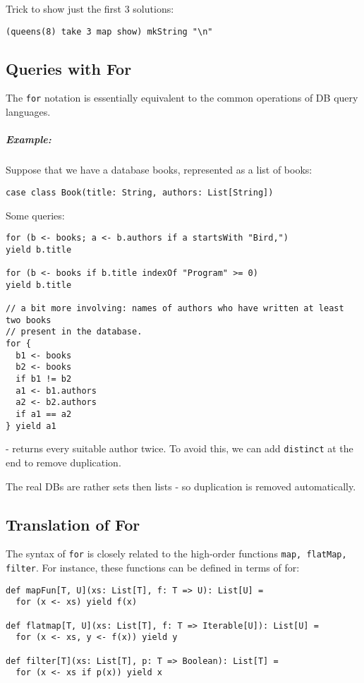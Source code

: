 \documentclass{scrartcl}
\newcommand{\example}{\subparagraph{Example:}} %
\newcommand{\term}[1]{\verb~#1~} %
\begin{document}
Trick to show just the first 3 solutions:
\begin{lstlisting}
(queens(8) take 3 map show) mkString "\n"
\end{lstlisting}

\subsection{Queries with For}
\label{sec:QueriesWithFor}

The \term{for} notation is essentially equivalent to the common operations of
DB query languages.
\example Suppose that we have a database books, represented as a list of books:
\begin{lstlisting}
case class Book(title: String, authors: List[String])
\end{lstlisting}

Some queries:
\begin{lstlisting}
for (b <- books; a <- b.authors if a startsWith "Bird,")
yield b.title

for (b <- books if b.title indexOf "Program" >= 0)
yield b.title

// a bit more involving: names of authors who have written at least two books
// present in the database.
for {
  b1 <- books
  b2 <- books
  if b1 != b2
  a1 <- b1.authors
  a2 <- b2.authors
  if a1 == a2
} yield a1
\end{lstlisting}
- returns every suitable author twice. To avoid this, we can add
\lstinline|distinct| at the end to remove duplication.

The real DBs are rather sets then lists - so duplication is removed
automatically.


\subsection{Translation of For}
\label{sec:TranslationOfFor}

The syntax of \lstinline|for| is closely related to the high-order functions
\lstinline|map, flatMap, filter|. For instance, these functions can be defined
in terms of for:
\begin{lstlisting}
def mapFun[T, U](xs: List[T], f: T => U): List[U] =
  for (x <- xs) yield f(x)

def flatmap[T, U](xs: List[T], f: T => Iterable[U]): List[U] =
  for (x <- xs, y <- f(x)) yield y

def filter[T](xs: List[T], p: T => Boolean): List[T] =
  for (x <- xs if p(x)) yield x
\end{lstlisting}
\end{document}
